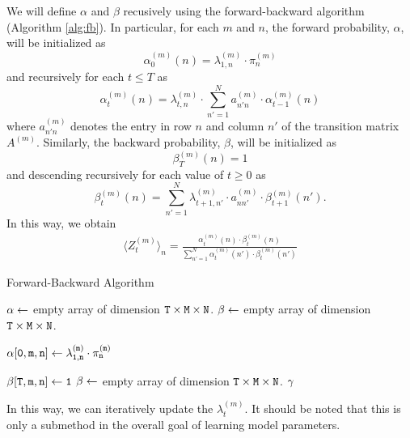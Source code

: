 \documentclass{amsart}
\begin{document}
We will define $\alpha$ and $\beta$ recusively using the 
forward-backward algorithm (Algorithm \ref{alg:fb}).  In particular, 
for each $m$ and $n$, the forward probability, $\alpha$, will be initialized as 
\[
\alpha_0^{(m)}(n) = \lambda_{1,n}^{(m)}\cdot \pi_n^{(m)}
\]
and recursively for each $t\leq T$ as 
\[
\alpha_t^{(m)}(n) = \lambda_{t,n}^{(m)} \cdot 
    \sum_{n'=1}^Na_{n'n}^{(m)}\cdot \alpha_{t-1}^{(m)}(n)
\]
where $a_{n'n}^{(m)}$ denotes the entry in row $n$ and column $n'$ of 
the transition matrix $A^{(m)}$.  Similarly, the backward probability, 
$\beta$, will be initialized as 
\[
\beta_T^{(m)}(n) = 1
\]
and descending recursively for each value of $t\geq 0$ as 
\[
\beta_{t}^{(m)}(n) = \sum_{n'=1}^N \lambda_{t+1,n'}^{(m)}\cdot 
a_{nn'}^{(m)}\cdot \beta_{t+1}^{(m)}(n'). 
\]
In this way, we obtain 
\begin{eqnarray*}
\langle Z_{t}^{(m)}\rangle_n = \frac{\alpha_t^{(m)}(n)\cdot 
\beta_t^{(m)}(n)}{\sum_{n'=1}^N\alpha_t^{(m)}(n'
)\cdot 
\beta_t^{(m)}(n')}
\end{eqnarray*}
\begin{algorithm}
  \caption{Forward-Backward Algorithm\label{alg:fb}}
  \begin{algorithmic}[1]
    \State $\tt{\alpha}\leftarrow$ empty array of 
    dimension $\tt{T\times M\times N}$.
    \State $\tt{\beta}\leftarrow$ empty array of 
    dimension $\tt{T\times M\times N}$.
    
    \State $\tt{\alpha[0,m,n]} \leftarrow \lambda_{1,n}^{(m)} \cdot
    \pi_n^{(m)}$
    
	\EndFor
	\State $\tt{\beta[T,m,n]} \leftarrow 1$
	\EndFor
    \EndFor
    \EndFor
    \State $\tt{\beta}\leftarrow$ empty array of 
    dimension $\tt{T\times M\times N}$.
    \EndFor
    \EndFor
    \EndFor
    \State\Return ${\tt \gamma}$
    \EndFunction
  \end{algorithmic}
\end{algorithm}
In this way, we can iteratively update the $\lambda_t^{(m)}$.  It 
should be noted that this is only a submethod in the overall goal of 
learning model parameters. 
\end{document}
